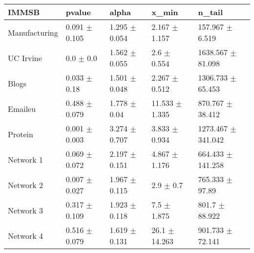 \begin{tabular}{@{}lllll@{}}
\toprule

\textbf{IMMSB} & pvalue & alpha & x\_min & n\_tail \\\midrule

Manufacturing & 0.091 \(\pm\) 0.105 & 1.295 \(\pm\) 0.054 & 2.167
\(\pm\) 1.157 & 157.967 \(\pm\) 6.519 \\
UC Irvine & 0.0 \(\pm\) 0.0 & 1.562 \(\pm\) 0.055 & 2.6 \(\pm\)
0.554 & 1638.567 \(\pm\) 81.098 \\
Blogs & 0.033 \(\pm\) 0.18 & 1.501 \(\pm\) 0.048 & 2.267 \(\pm\)
0.512 & 1306.733 \(\pm\) 65.453 \\
Emaileu & 0.488 \(\pm\) 0.079 & 1.778 \(\pm\) 0.04 & 11.533 \(\pm\)
1.335 & 870.767 \(\pm\) 38.412 \\
Protein & 0.001 \(\pm\) 0.003 & 3.274 \(\pm\) 0.707 & 3.833 \(\pm\)
0.934 & 1273.467 \(\pm\) 341.042 \\
Network 1 & 0.069 \(\pm\) 0.072 & 2.197 \(\pm\) 0.151 & 4.867 \(\pm\)
1.176 & 664.433 \(\pm\) 141.258 \\
Network 2 & 0.007 \(\pm\) 0.027 & 1.967 \(\pm\) 0.115 & 2.9 \(\pm\)
0.7 & 765.333 \(\pm\) 97.89 \\
Network 3 & 0.317 \(\pm\) 0.109 & 1.923 \(\pm\) 0.118 & 7.5 \(\pm\)
1.875 & 801.7 \(\pm\) 88.922 \\
Network 4 & 0.516 \(\pm\) 0.079 & 1.619 \(\pm\) 0.131 & 26.1 \(\pm\)
14.263 & 901.733 \(\pm\) 72.141 \\

\bottomrule
\end{tabular}
